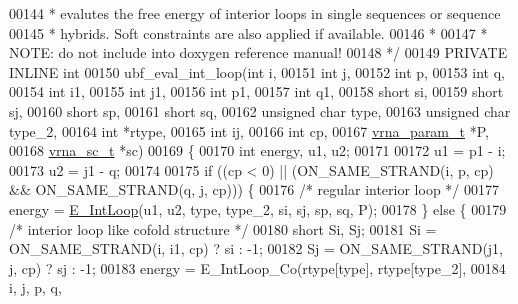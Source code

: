 \begin{DoxyCode}
00144 \textcolor{comment}{ *  evalutes the free energy of interior loops in single sequences or sequence}
00145 \textcolor{comment}{ *  hybrids. Soft constraints are also applied if available.}
00146 \textcolor{comment}{ *}
00147 \textcolor{comment}{ *  NOTE: do not include into doxygen reference manual!}
00148 \textcolor{comment}{ */}
00149 PRIVATE INLINE \textcolor{keywordtype}{int}
00150 ubf\_eval\_int\_loop(\textcolor{keywordtype}{int}           i,
00151                   \textcolor{keywordtype}{int}           j,
00152                   \textcolor{keywordtype}{int}           p,
00153                   \textcolor{keywordtype}{int}           q,
00154                   \textcolor{keywordtype}{int}           i1,
00155                   \textcolor{keywordtype}{int}           j1,
00156                   \textcolor{keywordtype}{int}           p1,
00157                   \textcolor{keywordtype}{int}           q1,
00158                   \textcolor{keywordtype}{short}         si,
00159                   \textcolor{keywordtype}{short}         sj,
00160                   \textcolor{keywordtype}{short}         sp,
00161                   \textcolor{keywordtype}{short}         sq,
00162                   \textcolor{keywordtype}{unsigned} \textcolor{keywordtype}{char} type,
00163                   \textcolor{keywordtype}{unsigned} \textcolor{keywordtype}{char} type\_2,
00164                   \textcolor{keywordtype}{int}           *rtype,
00165                   \textcolor{keywordtype}{int}           ij,
00166                   \textcolor{keywordtype}{int}           cp,
00167                   \hyperlink{group__energy__parameters_structvrna__param__s}{vrna\_param\_t}  *P,
00168                   \hyperlink{group__soft__constraints_structvrna__sc__s}{vrna\_sc\_t}     *sc)
00169 \{
00170   \textcolor{keywordtype}{int} energy, u1, u2;
00171 
00172   u1  = p1 - i;
00173   u2  = j1 - q;
00174 
00175   \textcolor{keywordflow}{if} ((cp < 0) || (ON\_SAME\_STRAND(i, p, cp) && ON\_SAME\_STRAND(q, j, cp))) \{
00176     \textcolor{comment}{/* regular interior loop */}
00177     energy = \hyperlink{group__loops_gaafbc187b7f78e8e82afb77dd6f3b8fc5}{E\_IntLoop}(u1, u2, type, type\_2, si, sj, sp, sq, P);
00178   \} \textcolor{keywordflow}{else} \{
00179     \textcolor{comment}{/* interior loop like cofold structure */}
00180     \textcolor{keywordtype}{short} Si, Sj;
00181     Si      = ON\_SAME\_STRAND(i, i1, cp) ? si : -1;
00182     Sj      = ON\_SAME\_STRAND(j1, j, cp) ? sj : -1;
00183     energy  = E\_IntLoop\_Co(rtype[type], rtype[type\_2],
00184                            i, j, p, q,

\end{DoxyCode}

